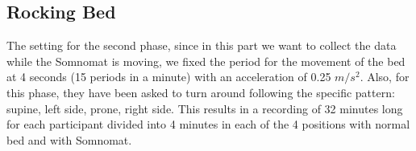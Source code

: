 \subsection{Rocking Bed}\label{cap:RockingBed}
The setting for the second phase, since in this part we want to collect the data while the Somnomat is moving, we fixed the period for the movement of the bed at 4 seconds (15 periods in a minute) with an acceleration of 0.25 $m/s^2$. Also, for this phase, they have been asked to turn around following the specific pattern: supine, left side, prone, right side.
This results in a recording of 32 minutes long for each participant divided into 4 minutes in each of the 4 positions with normal bed and with Somnomat.

